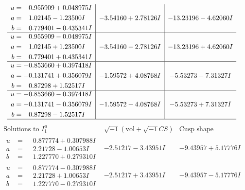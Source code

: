 \documentclass[1p]{elsarticle_modified}
\theoremstyle{definition}
\newcommand{\I}{\sqrt{-1}}
\begin{document}
$$\begin{array}{c|c|c}
\begin{aligned}
u &= \phantom{-}0.955909 + 0.048975 I \\
a &= \phantom{-}1.02145 - 1.23500 I \\
b &= \phantom{-}0.779401 - 0.435341 I\end{aligned}
 & -3.54160 + 2.78126 I & -13.23196 - 4.62060 I \\ \hline\begin{aligned}
u &= \phantom{-}0.955909 - 0.048975 I \\
a &= \phantom{-}1.02145 + 1.23500 I \\
b &= \phantom{-}0.779401 + 0.435341 I\end{aligned}
 & -3.54160 - 2.78126 I & -13.23196 + 4.62060 I \\ \hline\begin{aligned}
u &= -0.853660 + 0.397418 I \\
a &= -0.131741 + 0.356079 I \\
b &= \phantom{-}0.87298 + 1.52517 I\end{aligned}
 & -1.59572 + 4.08768 I & -5.53273 - 7.31327 I \\ \hline\begin{aligned}
u &= -0.853660 - 0.397418 I \\
a &= -0.131741 - 0.356079 I \\
b &= \phantom{-}0.87298 - 1.52517 I\end{aligned}
 & -1.59572 - 4.08768 I & -5.53273 + 7.31327 I\\
 \hline 
 \end{array}$$\newpage$$\begin{array}{c|c|c}  
\text{Solutions to }I^u_{1}& \I (\text{vol} + \sqrt{-1}CS) & \text{Cusp shape}\\
 \hline 
\begin{aligned}
u &= \phantom{-}0.877774 + 0.307988 I \\
a &= \phantom{-}2.21728 - 1.00653 I \\
b &= \phantom{-}1.227770 + 0.279310 I\end{aligned}
 & -2.51217 - 3.43951 I & -9.43957 + 5.17776 I \\ \hline\begin{aligned}
u &= \phantom{-}0.877774 - 0.307988 I \\
a &= \phantom{-}2.21728 + 1.00653 I \\
b &= \phantom{-}1.227770 - 0.279310 I\end{aligned}
 & -2.51217 + 3.43951 I & -9.43957 - 5.17776 I \\ \hline\begin{aligned}

\end{aligned}
\end{array}$$
\end{document}
